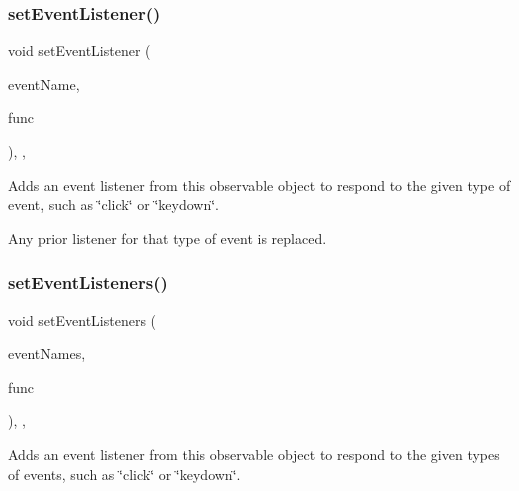 \subsubsection{\texorpdfstring{set\+Event\+Listener()}{setEventListener()}\hspace{0.1cm}{\footnotesize\ttfamily [2/2]}}
{\footnotesize\ttfamily void set\+Event\+Listener (\begin{DoxyParamCaption}\item[{const std\+::string \&}]{event\+Name,  }\item[{\mbox{\hyperlink{namespacesgl_a54427ce97bb1c2804e4fe2b0a62e8b17}{G\+Event\+Listener\+Void}}}]{func }\end{DoxyParamCaption})\hspace{0.3cm}{\ttfamily [protected]}, {\ttfamily [virtual]}, {\ttfamily [inherited]}}



Adds an event listener from this observable object to respond to the given type of event, such as \char`\"{}click\char`\"{} or \char`\"{}keydown\char`\"{}. 

Any prior listener for that type of event is replaced. \mbox{\label{classsgl_1_1GObservable_afa388d69c33c718cf035774604065604}} 
\subsubsection{\texorpdfstring{set\+Event\+Listeners()}{setEventListeners()}\hspace{0.1cm}{\footnotesize\ttfamily [1/2]}}
{\footnotesize\ttfamily void set\+Event\+Listeners (\begin{DoxyParamCaption}\item[{std\+::initializer\+\_\+list$<$ std\+::string $>$}]{event\+Names,  }\item[{\mbox{\hyperlink{namespacesgl_ae9f3e9eab70035da1a2b114e21357b25}{G\+Event\+Listener}}}]{func }\end{DoxyParamCaption})\hspace{0.3cm}{\ttfamily [protected]}, {\ttfamily [virtual]}, {\ttfamily [inherited]}}



Adds an event listener from this observable object to respond to the given types of events, such as \char`\"{}click\char`\"{} or \char`\"{}keydown\char`\"{}. 

